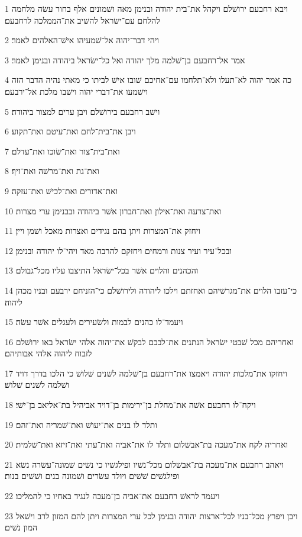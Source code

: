 \par 1 ויבא רחבעם ירושׁלם ויקהל את־בית יהודה ובנימן מאה ושׁמונים אלף בחור עשׂה מלחמה להלחם עם־ישׂראל להשׁיב את־הממלכה לרחבעם׃
\par 2 ויהי דבר־יהוה אל־שׁמעיהו אישׁ־האלהים לאמר׃
\par 3 אמר אל־רחבעם בן־שׁלמה מלך יהודה ואל כל־ישׂראל ביהודה ובנימן לאמר׃
\par 4 כה אמר יהוה לא־תעלו ולא־תלחמו עם־אחיכם שׁובו אישׁ לביתו כי מאתי נהיה הדבר הזה וישׁמעו את־דברי יהוה וישׁבו מלכת אל־ירבעם׃
\par 5 וישׁב רחבעם בירושׁלם ויבן ערים למצור ביהודה׃
\par 6 ויבן את־בית־לחם ואת־עיטם ואת־תקוע׃
\par 7 ואת־בית־צור ואת־שׂוכו ואת־עדלם׃
\par 8 ואת־גת ואת־מרשׁה ואת־זיף׃
\par 9 ואת־אדורים ואת־לכישׁ ואת־עזקה׃
\par 10 ואת־צרעה ואת־אילון ואת־חברון אשׁר ביהודה ובבנימן ערי מצרות׃
\par 11 ויחזק את־המצרות ויתן בהם נגידים ואצרות מאכל ושׁמן ויין׃
\par 12 ובכל־עיר ועיר צנות ורמחים ויחזקם להרבה מאד ויהי־לו יהודה ובנימן׃
\par 13 והכהנים והלוים אשׁר בכל־ישׂראל התיצבו עליו מכל־גבולם׃
\par 14 כי־עזבו הלוים את־מגרשׁיהם ואחזתם וילכו ליהודה ולירושׁלם כי־הזניחם ירבעם ובניו מכהן ליהוה׃
\par 15 ויעמד־לו כהנים לבמות ולשׂעירים ולעגלים אשׁר עשׂה׃
\par 16 ואחריהם מכל שׁבטי ישׂראל הנתנים את־לבבם לבקשׁ את־יהוה אלהי ישׂראל באו ירושׁלם לזבוח ליהוה אלהי אבותיהם׃
\par 17 ויחזקו את־מלכות יהודה ויאמצו את־רחבעם בן־שׁלמה לשׁנים שׁלושׁ כי הלכו בדרך דויד ושׁלמה לשׁנים שׁלושׁ׃
\par 18 ויקח־לו רחבעם אשׁה את־מחלת בן־ירימות בן־דויד אביהיל בת־אליאב בן־ישׁי׃
\par 19 ותלד לו בנים את־יעושׁ ואת־שׁמריה ואת־זהם׃
\par 20 ואחריה לקח את־מעכה בת־אבשׁלום ותלד לו את־אביה ואת־עתי ואת־זיזא ואת־שׁלמית׃
\par 21 ויאהב רחבעם את־מעכה בת־אבשׁלום מכל־נשׁיו ופילגשׁיו כי נשׁים שׁמונה־עשׂרה נשׂא ופילגשׁים שׁשׁים ויולד עשׂרים ושׁמונה בנים ושׁשׁים בנות׃
\par 22 ויעמד לראשׁ רחבעם את־אביה בן־מעכה לנגיד באחיו כי להמליכו׃
\par 23 ויבן ויפרץ מכל־בניו לכל־ארצות יהודה ובנימן לכל ערי המצרות ויתן להם המזון לרב וישׁאל המון נשׁים׃

